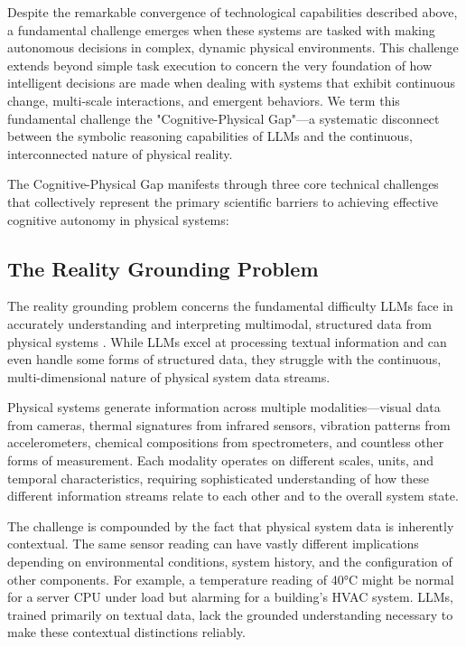 Despite the remarkable convergence of technological capabilities described above, a fundamental challenge emerges when these systems are tasked with making autonomous decisions in complex, dynamic physical environments. This challenge extends beyond simple task execution to concern the very foundation of how intelligent decisions are made when dealing with systems that exhibit continuous change, multi-scale interactions, and emergent behaviors. We term this fundamental challenge the "Cognitive-Physical Gap"—a systematic disconnect between the symbolic reasoning capabilities of LLMs and the continuous, interconnected nature of physical reality.

The Cognitive-Physical Gap manifests through three core technical challenges that collectively represent the primary scientific barriers to achieving effective cognitive autonomy in physical systems:

\subsection{The Reality Grounding Problem}

The reality grounding problem concerns the fundamental difficulty LLMs face in accurately understanding and interpreting multimodal, structured data from physical systems \cite{harnad1990symbol, barsalou2008grounded}. While LLMs excel at processing textual information and can even handle some forms of structured data, they struggle with the continuous, multi-dimensional nature of physical system data streams.

Physical systems generate information across multiple modalities—visual data from cameras, thermal signatures from infrared sensors, vibration patterns from accelerometers, chemical compositions from spectrometers, and countless other forms of measurement. Each modality operates on different scales, units, and temporal characteristics, requiring sophisticated understanding of how these different information streams relate to each other and to the overall system state.

The challenge is compounded by the fact that physical system data is inherently contextual. The same sensor reading can have vastly different implications depending on environmental conditions, system history, and the configuration of other components. For example, a temperature reading of 40°C might be normal for a server CPU under load but alarming for a building's HVAC system. LLMs, trained primarily on textual data, lack the grounded understanding necessary to make these contextual distinctions reliably.

